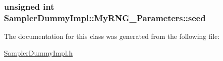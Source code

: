 \subsubsection[{\texorpdfstring{seed}{seed}}]{\setlength{\rightskip}{0pt plus 5cm}unsigned int Sampler\+Dummy\+Impl\+::\+My\+R\+N\+G\+\_\+\+Parameters\+::seed}\hypertarget{class_sampler_dummy_impl_1_1_my_r_n_g___parameters_a20dd6b48cb11bfefeaf8efc8f9a8c588}{}\label{class_sampler_dummy_impl_1_1_my_r_n_g___parameters_a20dd6b48cb11bfefeaf8efc8f9a8c588}


The documentation for this class was generated from the following file\+:\begin{DoxyCompactItemize}
\item 
\hyperlink{_sampler_dummy_impl_8h}{Sampler\+Dummy\+Impl.\+h}\end{DoxyCompactItemize}
